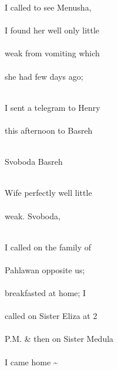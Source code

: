 \documentclass{report}
\begin{document}


	\par{
 	I called to see Menusha,\ \\\ \\I found her well only little\ \\\ \\weak from vomiting which\ \\\ \\she had few days ago;\ \\\ \\
	}

	\par{
 	I sent a telegram to Henry\ \\\ \\this afternoon to Basreh\ \\\ \\
	}

	\par{
 	Svoboda Basreh\ \\\ \\
	}

	\par{
 	Wife perfectly well little\ \\\ \\weak. Svoboda,\ \\\ \\
	}

	\par{
 	I called on the family of\ \\\ \\Pahlawan opposite us;\ \\\ \\breakfasted at home; I\ \\\ \\called on Sister Eliza at 2\ \\\ \\P.M. \& then on Sister Medula\ \\\ \\I came home \~{}\ \\\ \\
	}
\end{document}
